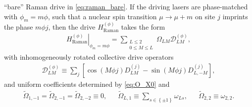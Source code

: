\documentclass[nofootinbib,notitlepage,11pt]{revtex4-2}
\renewcommand{\t}{\text} %
\newcommand{\p}[1]{\left(#1\right)} %
\renewcommand{\sp}[1]{\left[#1\right]} %
\renewcommand{\set}[1]{\left\{#1\right\}} %
\newcommand{\1}{\mathds{1}}
\newcommand{\D}{\mathcal{D}}
\begin{document}
``bare'' Raman drive in \eqref{eq:raman_bare}.  If the driving lasers
are phase-matched with $\phi_m=m\phi$, such that a nuclear spin
transition $\mu\to\mu+m$ on site $j$ imprints the phase $m\phi j$,
then the drive $H_{\t{Raman}}^{(\phi)}$ takes the form
\begin{align}
  \left. H_{\t{Raman}}^{(\phi)} \right|_{\phi_m=m\phi}
  = \sum_{\substack{L\le2\\0\le M\le L}} \Omega_{LM} \D_{LM}^{(\phi)},
\end{align}
with inhomogeneously rotated collective drive operators
\begin{align}
  \D_{LM}^{(\phi)}
  \equiv \sum_j \sp{\cos\p{M\phi j} D_{LM}^{(j)}
    - \sin\p{M\phi j} D_{L,-M}^{(j)}},
\end{align}
and uniform coefficients determined by \eqref{eq:O_X0} and
\begin{align}
  \tilde\Omega_{1,-1} = \tilde\Omega_{2,-1}
  = \tilde\Omega_{2,-2} \equiv 0,
  &&
  \tilde\Omega_{L,1} \equiv \sum_{s\in\set{\pm1}} \omega_{Ls},
  &&
  \tilde\Omega_{2,2} \equiv \omega_{2,2}.
\end{align}


\end{document}
